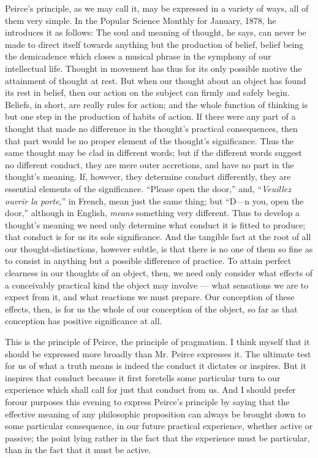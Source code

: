 \documentclass[]{article}
\begin{document}
Peirce's principle, as we may call it, may be expressed in a variety of ways, all of them very simple. In the Popular Science Monthly for January, 1878, he introduces it as follows: The soul and meaning of thought, he says, can never be made to direct itself towards anything but the production of belief, belief being the demicadence which closes a musical phrase in the symphony of our intellectual life. Thought in movement has thus for its only possible motive the attainment of thought at rest. But when our thought about an object has found its rest in belief, then our action on the subject can firmly and safely begin. Beliefs, in short, are really rules for action; and the whole function of thinking is but one step in the production of habits of action. If there were any part of a thought that made no difference in the thought's practical consequences, then that part would be no proper element of the thought's significance. Thus the same thought may be clad in different words; but if the different words suggest no different conduct, they are mere outer accretions, and have no part in the thought's meaning. If, however, they determine conduct differently, they are essential elements of the significance. ``Please open the door,'' and, ``\emph{Veuillez ouvrir la porte},'' in French, mean just the same thing; but ``D---n you, open the door,'' although in English, \emph{means} something very different. Thus to develop a thought's meaning we need only determine what conduct it is fitted to produce; that conduct is for us its sole significance. And the tangible fact at the root of all our thought-distinctions, however subtle, is that there is no one of them so fine as to consist in anything but a possible difference of practice. To attain perfect clearness in our thoughts of an object, then, we need only consider what effects of a conceivably practical kind the object may involve --- what sensations we are to expect from it, and what reactions we must prepare. Our conception of these effects, then, is for us the whole of our conception of the object, so far as that conception has positive significance at all. 

This is the principle of Peirce, the principle of pragmatism. I think myself that it should be expressed more broadly  than Mr. Peirce expresses it. The ultimate test for us of what a truth means is indeed the conduct it dictates or inspires. But it inspires that conduct because it first foretells some particular turn to our experience which shall call for just that conduct from us. And I should prefer forour purposes this evening to express Peirce's principle by saying that the effective meaning of any philosophic proposition can always be brought down to some particular consequence, in our future practical experience, whether active or passive; the point lying rather in the fact that the experience must be particular, than in the fact that it must be active. 
\end{document}
